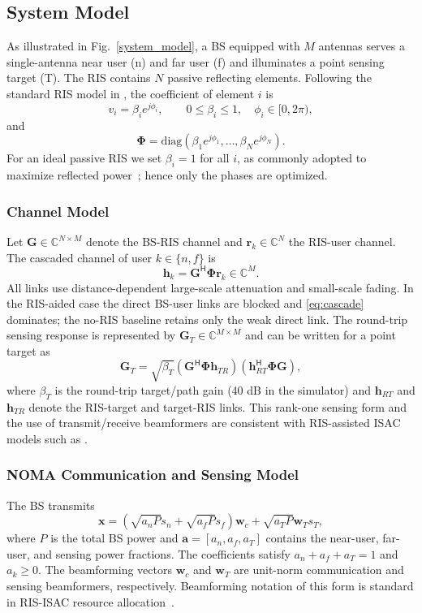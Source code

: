 \documentclass[10pt,journal]{IEEEtran}
\newcommand{\bh}{\bm{h}}
\newcommand{\bw}{\bm{w}}
\newcommand{\bG}{\bm{G}}
\newcommand{\bPhi}{\bm{\Phi}}
\newcommand{\herm}{^{\mathsf{H}}}
\newcommand{\Cset}{\mathbb{C}}
\begin{document}
\subsection{System Model}
As illustrated in Fig.~\ref{system_model}, a BS equipped with $M$ antennas serves
a single-antenna near user (n) and far user (f) and illuminates a point sensing
target (T). The RIS contains $N$ passive reflecting elements. Following the
standard RIS model in \cite{zou2023ml,wei2026ris}, the coefficient of element
$i$ is
\begin{equation}
 v_i=\beta_i e^{j\phi_i},\qquad 0\leq\beta_i\leq1,\quad \phi_i\in[0,2\pi),
\end{equation}
and
\begin{equation}
\bPhi=\mathrm{diag}(\beta_1e^{j\phi_1},\ldots,\beta_Ne^{j\phi_N}).
\end{equation}
For an ideal passive RIS we set $\beta_i=1$ for all $i$, as commonly adopted to
maximize reflected power~\cite{zou2023ml,wei2026ris}; hence only the phases are
optimized.

\subsubsection{Channel Model}
Let $\bG\in\Cset^{N\times M}$ denote the BS-RIS channel and
$\bm{r}_k\in\Cset^N$ the RIS-user channel. The cascaded channel of user
$k\in\{n,f\}$ is
\begin{equation}
\bh_k=\bG\herm\bPhi\bm{r}_k\in\Cset^M. \label{eq:cascade}
\end{equation}
All links use distance-dependent large-scale attenuation and small-scale fading.
In the RIS-aided case the direct BS-user links are blocked and
\eqref{eq:cascade} dominates; the no-RIS baseline retains only the weak direct
link. The round-trip sensing response is represented by
$\bG_T\in\Cset^{M\times M}$ and can be written for a point target as
\begin{equation}
\bG_T=\sqrt{\beta_T}(\bG\herm\bPhi\bm{h}_{TR})
(\bm{h}_{RT}\herm\bPhi\bG),
\end{equation}
where $\beta_T$ is the round-trip target/path gain (40 dB in the simulator) and
$\bm{h}_{RT}$ and $\bm{h}_{TR}$ denote the RIS-target and target-RIS links. This
rank-one sensing form and the use of transmit/receive beamformers are consistent
with RIS-assisted ISAC models such as \cite{wang2025hybrid,lyu2024crb}.

\subsubsection{NOMA Communication and Sensing Model}
The BS transmits
\begin{equation}
\bm{x}=\left(\sqrt{a_nP}s_n+\sqrt{a_fP}s_f\right)\bw_c
       +\sqrt{a_TP}\bw_Ts_T, \label{eq:tx}
\end{equation}
where $P$ is the total BS power and
$\bm{a}=[a_n,a_f,a_T]$ contains the near-user, far-user, and sensing power
fractions. The coefficients satisfy $a_n+a_f+a_T=1$ and $a_k\geq0$. The
beamforming vectors $\bw_c$ and $\bw_T$ are unit-norm communication and sensing
beamformers, respectively. Beamforming notation of this form is standard in
RIS-ISAC resource allocation~\cite{wang2025hybrid,wei2026ris}.
\end{document}
